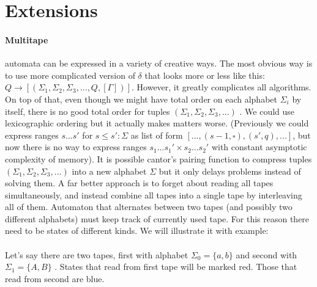 \documentclass[12pt]{article}
\begin{document}
\section{Extensions}

\paragraph{Multitape} automata can be expressed in a variety of creative ways. The most obvious way is to use more complicated version of $\delta$ that looks more or less like this: $Q \rightarrow [ (\Sigma_1 ,  \Sigma_2 ,  \Sigma_3 , ... , Q , [ \Gamma ])]$. However, it greatly complicates all algorithms. On top of that, even though we might have total order on each alphabet $\Sigma_i$ by itself, there is no good total order for tuples $(\Sigma_1 ,  \Sigma_2 ,  \Sigma_3 , ... )$ . We could use lexicographic ordering but it actually makes matters worse. (Previously we could express ranges $s ... s'$ for $s\le s':\Sigma$ as list of form $[ ...,(s-1,\square),(s',q), ...]$, but now there is no way to express ranges $s_1...s_1' \times s_2...s_2'$ with constant asymptotic complexity of memory). It is possible cantor's pairing function to compress tuples $(\Sigma_1 ,  \Sigma_2 ,  \Sigma_3 , ...) $ into a new alphabet $\Sigma$ but it only delays problems instead of solving them. A far better approach is to forget about reading all tapes simultaneously, and instead combine all tapes into a single tape by interleaving all of them. Automaton that alternates between two tapes (and possibly two different alphabets) must keep track of currently used tape. For this reason there need to be  states of different kinds. We will illustrate it with example: \\
\\
Let's say there are two tapes, first with alphabet $\Sigma_0=\{ a , b\}$ and second with  $\Sigma_1=\{A,B\}$ . States that read from first tape will be marked red. Those that read from second are blue.
\end{document}
